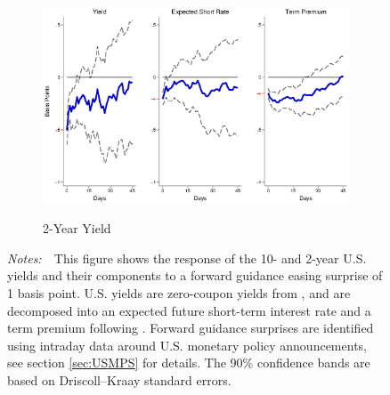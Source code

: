 \documentclass[a4paper, 12pt]{article}
\newcommand{\figtext}[1]{
	\vspace{-1ex}
	\captionsetup{justification=justified,font=footnotesize}
	\caption*{#1}
}
\newcommand{\fignotes}[1]{\figtext{\emph{Notes:~}~#1}}
\begin{document}
\begin{appendices}
\begin{landscape}
\begin{figure}[tbph]
\begin{center}
\begin{minipage}{\linewidth}
\begin{center}
						\begin{subfigure}[t]{\linewidth}
							\includegraphics[trim={0cm 0cm 0cm 0cm},clip,height=0.35\textheight,width=\linewidth]{../Figures/PathUSDnomyptp24m.eps} \\
							\vspace{-0.35cm}
							\caption{2-Year Yield} \label{subfig:LPUS2YpathWh}
						\end{subfigure}
						\vspace{-0.45cm}
					\end{center}
					\fignotes{This figure shows the response of the 10- and 2-year U.S. yields and their components to a forward guidance easing surprise of 1 basis point. U.S. yields are zero-coupon yields from \cite{GSW:2007}, and are decomposed into an expected future short-term interest rate and a term premium following \cite{KimWright:2005}. Forward guidance surprises are identified using intraday data around U.S. monetary policy announcements, see section \ref{sec:USMPS} for details. The 90\% confidence bands are based on Driscoll--Kraay standard errors.}
				\end{minipage}
			\end{center}
		\end{figure}
		
	\end{landscape}
	
	
	\begin{landscape}
		

\end{landscape}
\end{appendices}
\end{document}
